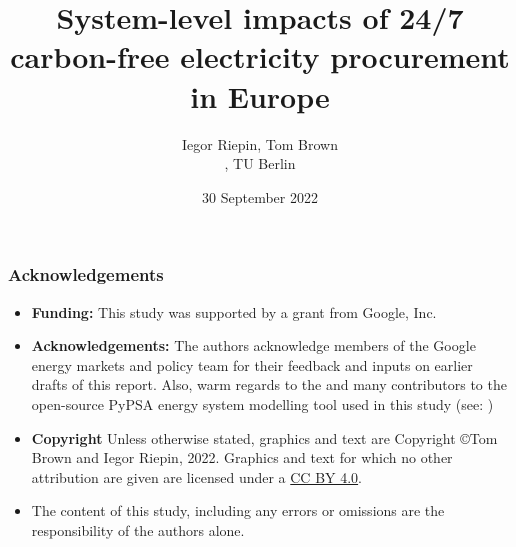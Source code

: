 

\title{System-level impacts of 24/7 carbon-free electricity procurement in Europe}

\author{
  Iegor Riepin, Tom Brown\\
  , TU Berlin
}

\date{30 September 2022}




\maketitle


\begin{frame}
  \frametitle{Acknowledgements}

  \begin{itemize}
    \item {\bf Funding:} This study was supported by a grant from Google, Inc. 
    \item {\bf Acknowledgements:} The authors acknowledge members of the Google energy markets and policy team 
    for their feedback and inputs on earlier drafts of this report. 
    Also, warm regards to the  and many contributors to the open-source 
    PyPSA energy system modelling tool used in this study (see: )
    \item 
    {\bf Copyright} Unless otherwise stated, graphics and text are Copyright \copyright Tom Brown and Iegor Riepin, 2022.
    Graphics and text for which no other attribution are given are licensed under a 
    \href{https://creativecommons.org/licenses/by/4.0/}{CC BY 4.0}.  {\footnotesize \ccby} 
    \item The content of this study, including any errors or omissions are the responsibility
    of the authors alone.
  \end{itemize}

\end{frame}


